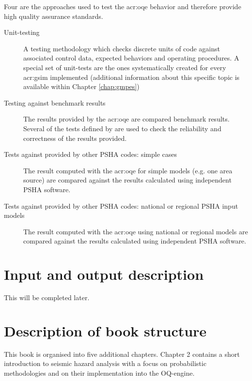 Four are the approaches used to test the \gls{acr:oqe} behavior 
and therefore provide high quality assurance standards. 
%
\begin{description}
    \item [Unit-testing] A testing methodology which checks discrete 
        units of code against associated control data, expected behaviors 
        and operating procedures. A special set of unit-tests are the ones
        systematically created for every \gls{acr:gsim} implemented 
        (additional information about this specific topic is available within 
        Chapter \ref{chap:gmpes})
    \item [Testing against benchmark results] The results provided by the 
        \gls{acr:oqe} are compared benchmark results. Several of the 
        tests defined by \textcite{thomas2010} are used to check the 
        reliability and correctness of the results provided. 
    \item [Tests against provided by other PSHA codes: simple cases] 
        The result computed with the \gls{acr:oqe} for simple models (e.g. one
        area source) are compared against the results calculated using 
        independent PSHA software.
    \item [Tests against provided by other PSHA codes: national or regional 
        PSHA input models] The result computed with the \gls{acr:oqe} 
        using national or regional models are compared against the 
        results calculated using independent PSHA software.
\end{description}
%
\section{Input and output description}
This will be completed later.
%
\section{Description of book structure}
This book is organised into five additional chapters. Chapter 2 contains a 
short introduction to seismic hazard analysis with a focus on probabilistic 
methodologies and on their implementation into the OQ-engine.
